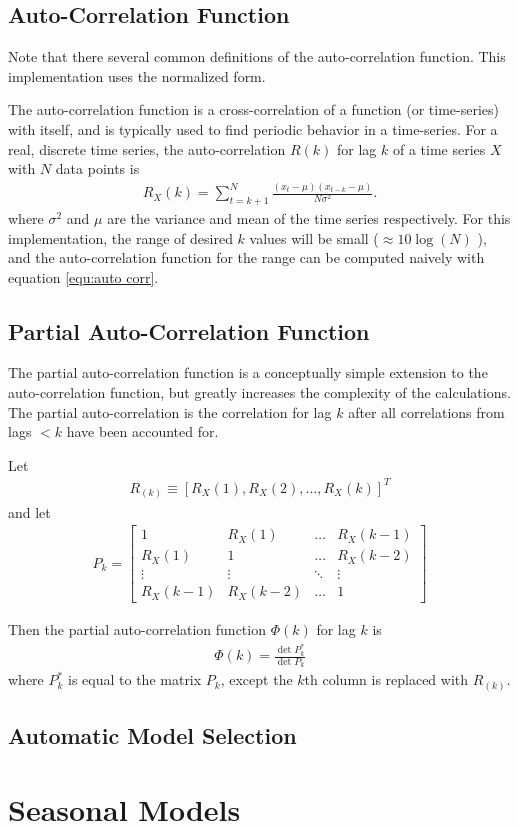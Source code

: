\subsection{Auto-Correlation Function}
Note that there several common definitions of the auto-correlation function.  This implementation uses the normalized form.

The auto-correlation function  is a cross-correlation of a function (or time-series) with itself, and is typically used to find periodic behavior in a time-series.  For a real, discrete time series, the auto-correlation  $R(k)$ for lag $k$ of a time series $X$ with $N$ data points  is
\begin{align}\label{equ:auto corr}
R_X(k) =\sum_{t=k+1}^N  \frac{(x_t -\mu) (x_{t-k} - \mu)}{N \sigma^2} .
\end{align}
where $\sigma^2$ and $\mu$ are the variance and mean of the time series respectively.
For this implementation, the range of desired $k$ values will be small ($\approx 10\log(N)$ ), and the auto-correlation function for the range can be computed naively with equation \ref{equ:auto corr}.

\subsection{Partial Auto-Correlation Function}
The partial auto-correlation function is a conceptually simple extension to the auto-correlation function, but greatly increases the complexity of the calculations.  The partial auto-correlation is the correlation for lag $k$ after all correlations from lags $<k$ have been accounted for.

Let
\begin{align}
R_{(k)} \equiv  \left[ R_X(1), R_X(2), \dots, R_X(k)\right]^T
\end{align}
and let
\begin{align}
P_k = \left[ \begin{matrix}
1 &  R_X(1) & \dots & R_X(k-1) \\
R_X(1) & 1 & \dots & R_X(k-2) \\
\vdots & \vdots & \ddots & \vdots \\
R_X(k-1) &R_X(k-2) & \dots & 1 \end{matrix} \right]
\end{align}

Then the partial auto-correlation function $\Phi(k)$ for lag $k$ is
\begin{align}
\Phi(k) = \frac{ \det P^*_k}{\det P_k}
\end{align}
where $P^*_k$ is equal to the matrix $P_k$, except the $k$th column is replaced with $R_{(k)}$.

\subsection{Automatic Model Selection}

\section{Seasonal Models}
